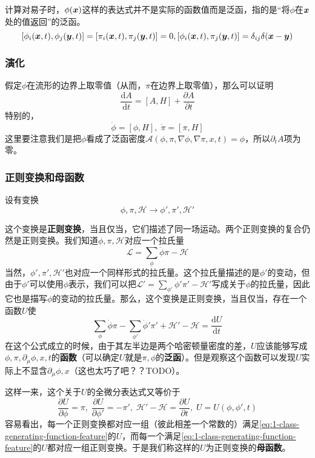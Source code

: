 \documentclass[UTF8, a4paper]{ctexart}
\begin{document}
计算对易子时，$\phi(\vb*{x})$这样的表达式并不是实际的函数值而是泛函，指的是“将$\phi$在$\vb*{x}$处的值返回”的泛函。
\[
    [\phi_i(\vb*{x}, t), \phi_j(\vb*{y}, t)] = [\pi_i(\vb*{x}, t), \pi_j(\vb*{y}, t)] = 0, 
    [\phi_i(\vb*{x}, t), \pi_j(\vb*{y}, t)] = \delta_{ij} \delta(\vb*{x} - \vb*{y})
\]

\subsubsection{演化}
假定$\phi$在流形的边界上取零值（从而，$\pi$在边界上取零值），那么可以证明
\begin{equation}
    \frac{\mathrm{d}A}{\mathrm{d}t} = [A, H] + \frac{\partial A}{\partial t}
    \label{eq:time-evolution}
\end{equation}
特别的，
\begin{equation}
    \dot{\phi} = [\phi, H], \; \dot{\pi} = [\pi, H]
\end{equation}
这里要注意我们是把$\phi$看成了泛函密度$\mathcal{A}(\phi, \pi, \nabla \phi, \nabla \pi, x, t) = \phi$，所以$\partial_t A$项为零。

\subsubsection{正则变换和母函数}
设有变换
\begin{equation}
    \phi, \pi, \mathcal{H} \longrightarrow \phi', \pi', \mathcal{H}'
    \label{eq:canonical-transformation}
\end{equation}

这个变换是\textbf{正则变换}，当且仅当，它们描述了同一场运动。两个正则变换的复合仍然是正则变换。我们知道$\phi, \pi, \mathcal{H}$对应一个拉氏量
\[
    \mathcal{L} = \sum_\phi \dot{\phi} \pi - \mathcal{H}
\]
当然，$\phi', \pi', \mathcal{H}'$也对应一个同样形式的拉氏量。这个拉氏量描述的是$\phi'$的变动，但由于$\phi'$可以使用$\phi$表示，我们可以把$\mathcal{L}' = \sum_{\phi'} \dot{\phi}' \pi' - \mathcal{H}'$写成关于$\phi$的拉氏量，因此它也是描写$\phi$的变动的拉氏量。那么，这个变换是正则变换，当且仅当，存在一个函数$U$使
\[
    \sum_\phi \dot{\phi} \pi - \sum_{\phi'} \dot{\phi}' \pi' + \mathcal{H}' - \mathcal{H} = \frac{\mathrm{d}U}{\mathrm{d}t}
\]
在这个公式成立的时候，由于其左半边是两个哈密顿量密度的差，$U$应该能够写成$\phi, \pi,  \partial_\mu \phi, x, t$的\textbf{函数}（可以确定$U$就是$\pi, \phi$的\textbf{泛函}）。但是观察这个函数可以发现$U$实际上不显含$\partial_\mu \phi, x$（这也太巧了吧？？TODO）。

这样一来，这个关于$U$的全微分表达式又等价于
\begin{equation}
    \frac{\partial U}{\partial \phi} = \pi, \; \frac{\partial U}{\partial \phi'} = -\pi', \; \mathcal{H}' - \mathcal{H} = \frac{\partial U}{\partial t}, \; U=U(\phi, \phi', t)
    \label{eq:1-class-generating-function-feature}
\end{equation}
容易看出，每一个正则变换都对应一组（彼此相差一个常数的）满足\eqref{eq:1-class-generating-function-feature}的$U$，而每一个满足\eqref{eq:1-class-generating-function-feature}的$U$都对应一组正则变换。于是我们称这样的$U$为正则变换的\textbf{母函数}。
\end{document}
